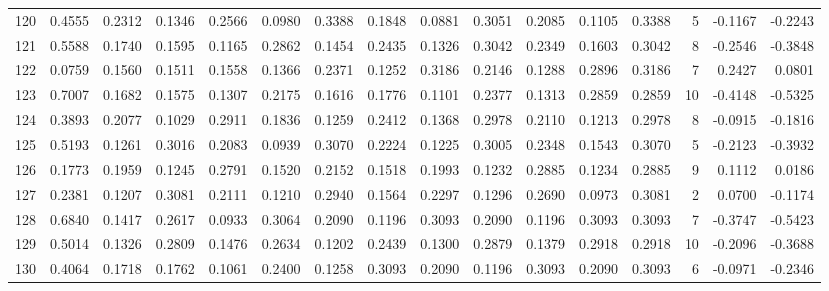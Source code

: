 \begin{tabular}{lrrrrrrrrrrrrrrr}
120 &      0.4555 &  0.2312 &  0.1346 &  0.2566 &  0.0980 &  0.3388 &  0.1848 &  0.0881 &  0.3051 &  0.2085 &   0.1105 &     0.3388 &      5 &                   -0.1167 &                    -0.2243 \\
121 &      0.5588 &  0.1740 &  0.1595 &  0.1165 &  0.2862 &  0.1454 &  0.2435 &  0.1326 &  0.3042 &  0.2349 &   0.1603 &     0.3042 &      8 &                   -0.2546 &                    -0.3848 \\
122 &      0.0759 &  0.1560 &  0.1511 &  0.1558 &  0.1366 &  0.2371 &  0.1252 &  0.3186 &  0.2146 &  0.1288 &   0.2896 &     0.3186 &      7 &                    0.2427 &                     0.0801 \\
123 &      0.7007 &  0.1682 &  0.1575 &  0.1307 &  0.2175 &  0.1616 &  0.1776 &  0.1101 &  0.2377 &  0.1313 &   0.2859 &     0.2859 &     10 &                   -0.4148 &                    -0.5325 \\
124 &      0.3893 &  0.2077 &  0.1029 &  0.2911 &  0.1836 &  0.1259 &  0.2412 &  0.1368 &  0.2978 &  0.2110 &   0.1213 &     0.2978 &      8 &                   -0.0915 &                    -0.1816 \\
125 &      0.5193 &  0.1261 &  0.3016 &  0.2083 &  0.0939 &  0.3070 &  0.2224 &  0.1225 &  0.3005 &  0.2348 &   0.1543 &     0.3070 &      5 &                   -0.2123 &                    -0.3932 \\
126 &      0.1773 &  0.1959 &  0.1245 &  0.2791 &  0.1520 &  0.2152 &  0.1518 &  0.1993 &  0.1232 &  0.2885 &   0.1234 &     0.2885 &      9 &                    0.1112 &                     0.0186 \\
127 &      0.2381 &  0.1207 &  0.3081 &  0.2111 &  0.1210 &  0.2940 &  0.1564 &  0.2297 &  0.1296 &  0.2690 &   0.0973 &     0.3081 &      2 &                    0.0700 &                    -0.1174 \\
128 &      0.6840 &  0.1417 &  0.2617 &  0.0933 &  0.3064 &  0.2090 &  0.1196 &  0.3093 &  0.2090 &  0.1196 &   0.3093 &     0.3093 &      7 &                   -0.3747 &                    -0.5423 \\
129 &      0.5014 &  0.1326 &  0.2809 &  0.1476 &  0.2634 &  0.1202 &  0.2439 &  0.1300 &  0.2879 &  0.1379 &   0.2918 &     0.2918 &     10 &                   -0.2096 &                    -0.3688 \\
130 &      0.4064 &  0.1718 &  0.1762 &  0.1061 &  0.2400 &  0.1258 &  0.3093 &  0.2090 &  0.1196 &  0.3093 &   0.2090 &     0.3093 &      6 &                   -0.0971 &                    -0.2346 \\

\end{tabular}
